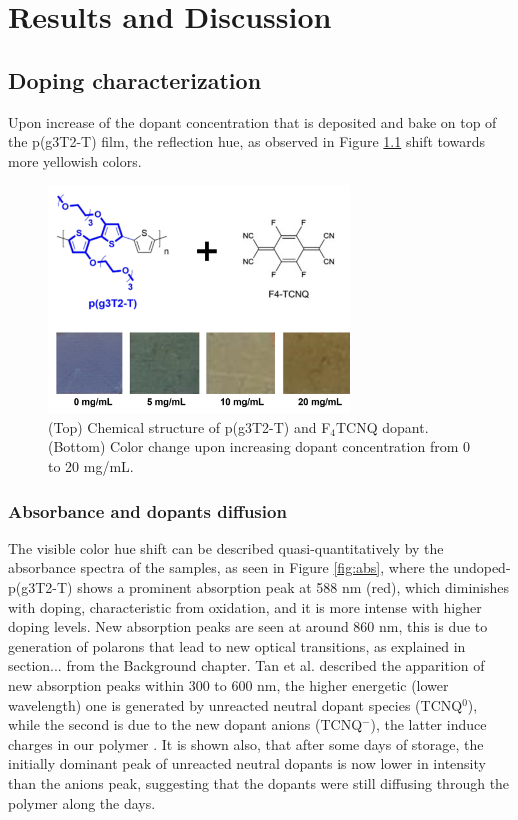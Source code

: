 \chapter{Results and Discussion}
\label{cha:3}

\section{Doping characterization}

Upon increase of the dopant concentration that is deposited and bake on top of the p(g3T2-T) film, the reflection hue, as observed in Figure \ref{fig:color} shift towards more yellowish colors.

\begin{figure}[ht]
  \centering
  \includegraphics[width=8cm]{Images/pdf/doping_color.pdf}
  \caption[Color shift upon doping level increase]{(Top) Chemical structure of p(g3T2-T) and F$_{4}$TCNQ dopant. (Bottom) Color change upon increasing dopant concentration from 0 to 20 mg/mL.}
  \label{fig:color}
\end{figure}

\subsection{Absorbance and dopants diffusion}
The visible color hue shift can be described quasi-quantitatively by the absorbance spectra of the samples, as seen in Figure \ref{fig:abs}, where the undoped-p(g3T2-T) shows a prominent absorption peak at 588 nm (red), which diminishes with doping, characteristic from oxidation, and it is more intense with higher doping levels. New absorption peaks are seen at around 860 nm, this is due to generation of polarons that lead to new optical transitions, as explained in section... from the Background chapter. Tan et al. described the apparition of new absorption peaks within 300 to 600 nm, the higher energetic (lower wavelength) one is generated by unreacted neutral dopant species (TCNQ$^{0}$), while the second is due to the new dopant anions (TCNQ$^{-}$), the latter induce charges in our polymer \cite{tanTuningOrganicElectrochemical2022}. It is shown also, that after some days of storage, the initially dominant peak of unreacted neutral dopants is now lower in intensity than the anions peak, suggesting that the dopants were still diffusing through the polymer along the days. 

